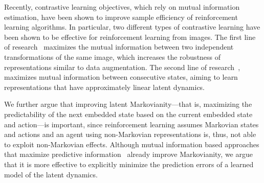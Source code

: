 \documentclass[a4paper,12pt]{article}
\begin{document}
Recently, contrastive learning objectives, which rely on mutual information estimation, have been shown to improve sample efficiency of reinforcement learning algorithms. In particular, two different types of contrastive learning have been shown to be effective for reinforcement learning from images. The first line of research~\cite{laskin2020curl} maximizes the mutual information between two independent transformations of the same image, which increases the robustness of representations similar to data augmentation. The second line of research~\cite{ anand2019unsupervised, oord2018}, maximizes mutual information between consecutive states, aiming to learn representations that have approximately linear latent dynamics. 



We further argue that improving latent Markovianity---that is, maximizing the predictability of the next embedded state based on the current embedded state and action---is important, since reinforcement learning assumes Markovian states and actions and an agent using non-Markovian representations is, thus, not able to exploit non-Markovian effects. Although mutual information based approaches that maximize predictive information~\cite{ lee2020predictive} already improve Markovianity, we argue that it is more effective to explicitly minimize the prediction errors of a learned model of the latent dynamics. 
\end{document}
